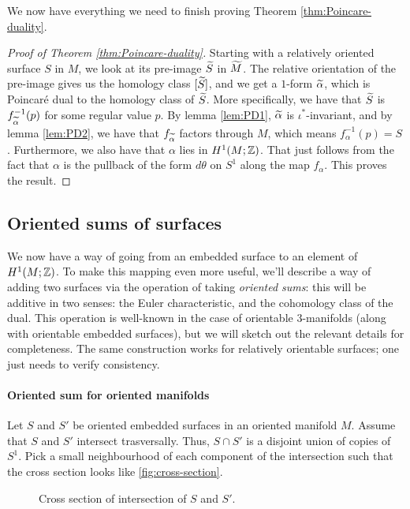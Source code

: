 We now have everything we need to finish proving Theorem \ref{thm:Poincare-duality}.
\begin{proof}[Proof of Theorem \ref{thm:Poincare-duality}]
  Starting with a relatively oriented surface $S$ in $M$, we look at its pre-image $\widetilde{S}$ in
  $\widetilde{M}$. The relative orientation of the pre-image gives us the homology class $[\widetilde{S}]$, and
  we get a $1$-form $\widetilde{\alpha}$, which is Poincar\'e dual to the homology class of $\widetilde{S}$.
  More specifically, we have that $\widetilde{S}$ is $f^{-1}_{\widetilde{\alpha}}(p)$ for some regular value $p$.
  By lemma \ref{lem:PD1}, $\widetilde{\alpha}$ is $\iota^{\ast}$-invariant, and by lemma \ref{lem:PD2}, we
  have that $f_{\widetilde{\alpha}}$ factors through $M$, which means $f_{\alpha}^{-1}(p) =
  S$. Furthermore, we also have that $\alpha$ lies in $H^1(M; \mathbb{Z})$. That just follows from the
  fact that $\alpha$ is the pullback of the form $d\theta$ on $S^1$ along the map
  $f_{\alpha}$. This proves the result.
\end{proof}

\subsection{Oriented sums of surfaces}
\label{sec:orient-sums-surf}

We now have a way of going from an embedded surface to an element of $H^1(M; \mathbb{Z})$. To make this mapping even
more useful, we'll describe a way of adding two surfaces via the operation of taking \emph{oriented sums}:
this will be additive in two senses: the Euler characteristic, and the cohomology class of the dual. This
operation is well-known in the case of orientable $3$-manifolds (along with orientable embedded
surfaces), but we will sketch out the relevant details for completeness. The same construction works for
relatively orientable surfaces; one just needs to verify consistency.

\paragraph{Oriented sum for oriented manifolds}
Let $S$ and $S'$ be oriented embedded surfaces in an oriented manifold $M$. Assume that $S$ and $S'$ intersect
trasversally. Thus, $S \cap S'$ is a disjoint union of copies of $S^1$. Pick a small neighbourhood of each
component of the intersection such that the cross section looks like \autoref{fig:cross-section}.
\begin{figure}[h]
  \centering
  \caption{Cross section of intersection of $S$ and $S'$.}
  \label{fig:cross-section}
\end{figure}

